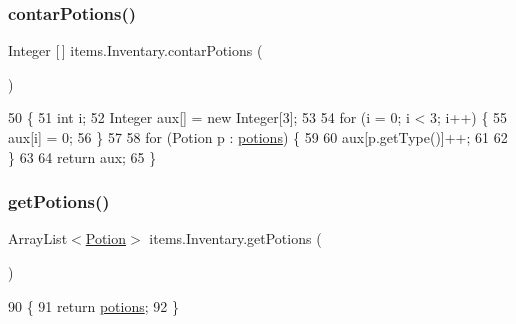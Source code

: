 \subsubsection{\texorpdfstring{contar\+Potions()}{contarPotions()}}
{\footnotesize\ttfamily Integer \mbox{[}$\,$\mbox{]} items.\+Inventary.\+contar\+Potions (\begin{DoxyParamCaption}{ }\end{DoxyParamCaption})\hspace{0.3cm}{\ttfamily [inline]}}


\begin{DoxyCode}
50                                      \{
51         \textcolor{keywordtype}{int} i;
52         Integer aux[] = \textcolor{keyword}{new} Integer[3];
53 
54         \textcolor{keywordflow}{for} (i = 0; i < 3; i++) \{
55             aux[i] = 0;
56         \}
57 
58         \textcolor{keywordflow}{for} (Potion p : \mbox{\hyperlink{classitems_1_1_inventary_afa542455e08a2cc05377133889b7b091}{potions}}) \{
59 
60             aux[p.getType()]++;
61 
62         \}
63 
64         \textcolor{keywordflow}{return} aux;
65     \}
\end{DoxyCode}
\mbox{\label{classitems_1_1_inventary_af31e133ffd38797c19c417526304fec7}} 
\subsubsection{\texorpdfstring{get\+Potions()}{getPotions()}}
{\footnotesize\ttfamily Array\+List$<$\mbox{\hyperlink{classitems_1_1_potion}{Potion}}$>$ items.\+Inventary.\+get\+Potions (\begin{DoxyParamCaption}{ }\end{DoxyParamCaption})\hspace{0.3cm}{\ttfamily [inline]}}


\begin{DoxyCode}
90                                           \{
91         \textcolor{keywordflow}{return} \mbox{\hyperlink{classitems_1_1_inventary_afa542455e08a2cc05377133889b7b091}{potions}};
92     \}
\end{DoxyCode}
\mbox{\label{classitems_1_1_inventary_a250533cf9b23d61ec3489446538e38d1}} 
